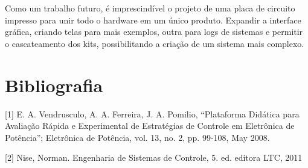 \documentclass[journal]{IEEEtranTIE}
\begin{document}
Como um trabalho futuro, é imprescindível o projeto de uma placa de circuito impresso para unir todo o hardware em um único produto. Expandir a interface gráfica, criando telas para mais exemplos, outra para logs de sistemas e permitir o cascateamento dos kits, possibilitando a criação de um sistema mais complexo.


 \section{Bibliografia}

[1] E. A. Vendrusculo, A. A. Ferreira, J. A. Pomilio, “Plataforma Didática para Avaliação Rápida e Experimental de Estratégias de Controle em Eletrônica de Potência”; Eletrônica de Potência, vol. 13, no. 2, pp. 99-108, May 2008.

[2] Nise, Norman. Engenharia de Sistemas de Controle, 5. ed. editora LTC, 2011
\end{document}
